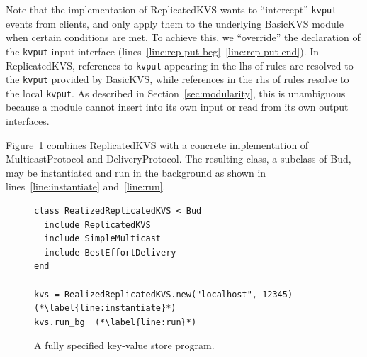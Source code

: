 Note that the implementation of ReplicatedKVS wants to ``intercept''
\texttt{kvput} events from clients, and only apply them to the underlying
BasicKVS module when certain conditions are met. To achieve this, we
``override'' the declaration of the \texttt{kvput} input interface
(lines~\ref{line:rep-put-beg}--\ref{line:rep-put-end}). In ReplicatedKVS,
references to \texttt{kvput} appearing in the lhs of rules are resolved to the
\texttt{kvput} provided by BasicKVS, while references in the rhs of rules
resolve to the local \texttt{kvput}. As described in
Section~\ref{sec:modularity}, this is unambiguous because a module cannot insert
into its own input or read from its own output interfaces.

Figure~\ref{fig:kvs-budclass} combines ReplicatedKVS with a concrete
implementation of MulticastProtocol and DeliveryProtocol.  The resulting class,
a subclass of Bud, may be instantiated and run in the background as shown in
lines~\ref{line:instantiate} and~\ref{line:run}.

\begin{figure}[t]
\begin{scriptsize}
\begin{lstlisting}
class RealizedReplicatedKVS < Bud
  include ReplicatedKVS
  include SimpleMulticast
  include BestEffortDelivery
end

kvs = RealizedReplicatedKVS.new("localhost", 12345)  (*\label{line:instantiate}*)
kvs.run_bg  (*\label{line:run}*)
\end{lstlisting}
\centering
\vspace{-10pt}
\caption{A fully specified key-value store program.}
\label{fig:kvs-budclass}
\end{scriptsize}
\vspace{-2pt}
\end{figure}

